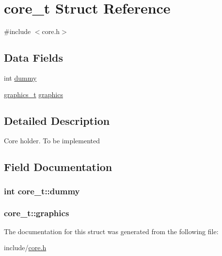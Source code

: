 \hypertarget{structcore__t}{}\section{core\+\_\+t Struct Reference}
\label{structcore__t}


{\ttfamily \#include $<$core.\+h$>$}

\subsection*{Data Fields}
\begin{DoxyCompactItemize}
\item 
int \hyperlink{structcore__t_aa8a3cd0e77fc7a69f992186415f6e6a1}{dummy}
\item 
\hyperlink{structgraphics__t}{graphics\+\_\+t} \hyperlink{structcore__t_a4728ed027923dd8568023862dd2887ef}{graphics}
\end{DoxyCompactItemize}


\subsection{Detailed Description}
Core holder. To be implemented 

\subsection{Field Documentation}
\subsubsection[{\texorpdfstring{dummy}{dummy}}]{\setlength{\rightskip}{0pt plus 5cm}int core\+\_\+t\+::dummy}\hypertarget{structcore__t_aa8a3cd0e77fc7a69f992186415f6e6a1}{}\label{structcore__t_aa8a3cd0e77fc7a69f992186415f6e6a1}
\subsubsection[{\texorpdfstring{graphics}{graphics}}]{ core\+\_\+t\+::graphics}\hypertarget{structcore__t_a4728ed027923dd8568023862dd2887ef}{}\label{structcore__t_a4728ed027923dd8568023862dd2887ef}


The documentation for this struct was generated from the following file\+:\begin{DoxyCompactItemize}
\item 
include/\hyperlink{core_8h}{core.\+h}\end{DoxyCompactItemize}
